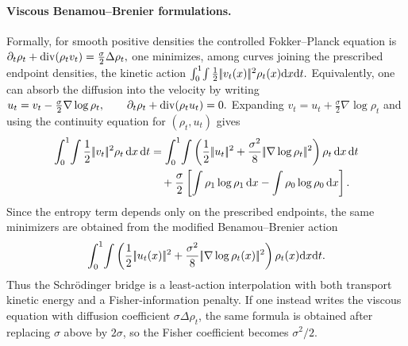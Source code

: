 \paragraph{Viscous Benamou--Brenier formulations.}
Formally, for smooth positive densities the controlled Fokker--Planck equation is \(\partial_t\rho_t+\operatorname{div}(\rho_t v_t) = \frac{\sigma}{2}\Delta\rho_t,\)
one minimizes, among curves joining the prescribed endpoint densities, the kinetic action
\(\int_0^1\!\int \frac12|\!| v_t(x) |\!|^2\rho_t(x)\mathrm{d} x\mathrm{d} t.\)
Equivalently, one can absorb the diffusion into the velocity by writing
\(u_t=v_t-\frac{\sigma}{2}\nabla\log\rho_t, \qquad \partial_t\rho_t+\operatorname{div}(\rho_t u_t)=0.\)
Expanding $v_t=u_t+\frac{\sigma}{2}\nabla\log\rho_t$ and using the continuity equation for $(\rho_t,u_t)$ gives
\begin{align*}
\int_0^1\!\int
\frac12\norm{v_t}^2\rho_t\,\d x\,\d t
&=
\int_0^1\!\int
\left(
\frac12\norm{u_t}^2
+
\frac{\sigma^2}{8}\norm{\nabla\log\rho_t}^2
\right)\rho_t\,\d x\,\d t
\\
&\quad+
\frac{\sigma}{2}
\left[
\int\rho_1\log\rho_1\,\d x
-
\int\rho_0\log\rho_0\,\d x
\right].
\end{align*}
Since the entropy term depends only on the prescribed endpoints, the same minimizers are obtained from the modified Benamou--Brenier action
\[
\int_0^1\!\int
\left(
\frac12|\!| u_t(x) |\!|^2
+
\frac{\sigma^2}{8}|\!| \nabla\log\rho_t(x) |\!|^2
\right)
\rho_t(x)\mathrm{d} x\mathrm{d} t.
\]
Thus the Schr\"odinger bridge is a least-action interpolation with both transport kinetic energy and a Fisher-information penalty. If one instead writes the viscous equation with diffusion coefficient $\sigma\Delta\rho_t$, the same formula is obtained after replacing $\sigma$ above by $2\sigma$, so the Fisher coefficient becomes $\sigma^2/2$.


